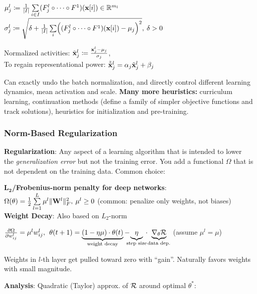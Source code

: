         \tab$\mu_j^l\coloneqq\frac{1}{\lvert I\rvert}\sum\limits_{i\in I}(F^l_j\circ\cdots\circ F^1)(\mathbf x\lbrack i\rbrack)\in\mathbb R^{m_l}$\\
        \tab$\sigma^l_j\coloneqq\sqrt{\delta+\frac{1}{\lvert I\rvert}\sum\limits_i\Bigr((F^l_j\circ\cdots\circ F^1)(\mathbf x\lbrack i\rbrack)-\mu_j\Bigr)^2},\>\delta>0$
        
        Normalized activities: $\Tilde{\mathbf x}^l_j\coloneqq\frac{\mathbf x^l_j-\mu_j}{\sigma_j}$,\\
        To regain representational power: $\Tilde{\Tilde{\mathbf x}}^l_j=\alpha_j\Tilde{\mathbf x}^l_j+\beta_j$
        
        Can exactly undo the batch normalization, and directly control different learning dynamics, mean activation and scale.
        \textbf{Many more heuristics:} curriculum learning, continuation methods (define a family of simpler objective functions and track solutions), heuristics for initialization and pre-training.
    
    \subsubsection{Norm-Based Regularization}
    \label{ssub:normbasedregularization}
        \textbf{Regularization}: Any aspect of a learning algorithm that is intended to lower the \emph{generalization error} but not the training error. You add a functional $\Omega$ that is not dependent on the training data. Common choice:
        
        \textbf{$\mathbf{L_2}$/Frobenius-norm penalty for deep networks}:\\ \tab$\Omega(\theta)=\frac{1}{2}\sum\limits_{l=1}^L\mu^l\lVert\mathbf W^l\rVert^2_F,\>\mu^l\geq0$ \begingroup\tiny{(common: penalize only weights, not biases)}\endgroup\\
        
        \textbf{Weight Decay}: Also based on $L_2$-norm
        
        $\frac{\partial \Omega}{\partial w^l_{ij}}=\mu^l w^l_{ij}, \>\>\theta(t+1)=\underbrace{(1-\eta\mu)\cdot\theta(t)}_\text{weight decay}-\!\!\!\!\underbrace{\eta}_\text{step size}\!\!\cdot\!\underbrace{\nabla_\theta\mathcal{R}}_\text{data dep.}$ (assume $\mu^l=\mu$)
        
        Weights in $l$-th layer get pulled toward zero with ``gain''. Naturally favors weights with small magnitude.
        
        \textbf{Analysis}: Quadratic (Taylor) approx. of $\mathcal{R}$ around optimal $\theta^*$:

